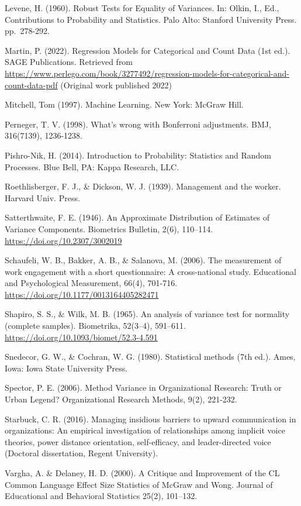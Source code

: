 \documentclass[
]{book}
\begin{document}
Levene, H. (1960). Robust Tests for Equality of Variances. In: Olkin, I., Ed., Contributions to Probability and Statistics. Palo Alto: Stanford University Press. pp.~278-292.

Martin, P. (2022). Regression Models for Categorical and Count Data (1st ed.). SAGE Publications. Retrieved from \url{https://www.perlego.com/book/3277492/regression-models-for-categorical-and-count-data-pdf} (Original work published 2022)

Mitchell, Tom (1997). Machine Learning. New York: McGraw Hill.

Perneger, T. V. (1998). What's wrong with Bonferroni adjustments. BMJ, 316(7139), 1236-1238.

Pishro-Nik, H. (2014). Introduction to Probability: Statistics and Random Processes. Blue Bell, PA: Kappa Research, LLC.

Roethlisberger, F. J., \& Dickson, W. J. (1939). Management and the worker. Harvard Univ. Press.

Satterthwaite, F. E. (1946). An Approximate Distribution of Estimates of Variance Components. Biometrics Bulletin, 2(6), 110--114. \url{https://doi.org/10.2307/3002019}

Schaufeli, W. B., Bakker, A. B., \& Salanova, M. (2006). The measurement of work engagement with a short questionnaire: A cross-national study. Educational and Psychological Measurement, 66(4), 701-716. \url{https://doi.org/10.1177/0013164405282471}

Shapiro, S. S., \& Wilk, M. B. (1965). An analysis of variance test for normality (complete samples). Biometrika, 52(3--4), 591--611. \url{https://doi.org/10.1093/biomet/52.3-4.591}

Snedecor, G. W., \& Cochran, W. G. (1980). Statistical methods (7th ed.). Ames, Iowa: Iowa State University Press.

Spector, P. E. (2006). Method Variance in Organizational Research: Truth or Urban Legend? Organizational Research Methods, 9(2), 221-232.

Starbuck, C. R. (2016). Managing insidious barriers to upward communication in organizations: An empirical investigation of relationships among implicit voice theories, power distance orientation, self-efficacy, and leader-directed voice (Doctoral dissertation, Regent University).

Vargha, A. \& Delaney, H. D. (2000). A Critique and Improvement of the CL Common Language Effect Size Statistics of McGraw and Wong. Journal of Educational and Behavioral Statistics 25(2), 101--132.
\end{document}
